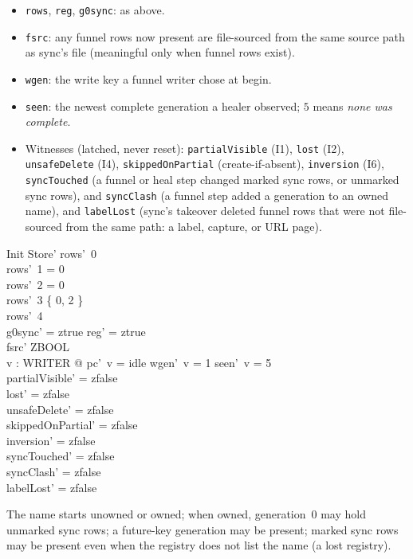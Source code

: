 \documentclass[a4paper,10pt,fleqn]{article}
\newcommand{\field}[1]{\texttt{#1}}
\begin{document}
\begin{itemize}
  \item \field{rows}, \field{reg}, \field{g0sync}: as above.
  \item \field{fsrc}: any funnel rows now present are file-sourced from the same
    source path as sync's file (meaningful only when funnel rows exist).
  \item \field{wgen}: the write key a funnel writer chose at begin.
  \item \field{seen}: the newest complete generation a healer observed; $5$
    means \emph{none was complete}.
  \item Witnesses (latched, never reset): \field{partialVisible} (I1),
    \field{lost} (I2), \field{unsafeDelete} (I4), \field{skippedOnPartial}
    (create-if-absent), \field{inversion} (I6), \field{syncTouched} (a funnel
    or heal step changed marked sync rows, or unmarked sync rows), and
    \field{syncClash} (a funnel step added a generation to an owned name), and
    \field{labelLost} (sync's takeover deleted funnel rows that were not
    file-sourced from the same path: a label, capture, or URL page).
\end{itemize}

\begin{schema}{Init}
Store'
\where
rows'~0   \\
rows'~1 = 0 \\
rows'~2 = 0 \\
rows'~3 \in \{ 0, 2 \} \\
rows'~4   \\
g0sync' = ztrue \implies reg' = ztrue \\
fsrc' \in ZBOOL \\
\forall v : WRITER @ pc'~v = idle \land wgen'~v = 1 \land seen'~v = 5 \\
partialVisible' = zfalse \\
lost' = zfalse \\
unsafeDelete' = zfalse \\
skippedOnPartial' = zfalse \\
inversion' = zfalse \\
syncTouched' = zfalse \\
syncClash' = zfalse \\
labelLost' = zfalse
\end{schema}

The name starts unowned or owned; when owned, generation~0 may hold unmarked
sync rows; a future-key generation may be present; marked sync rows may be
present even when the registry does not list the name (a lost registry).
\end{document}
